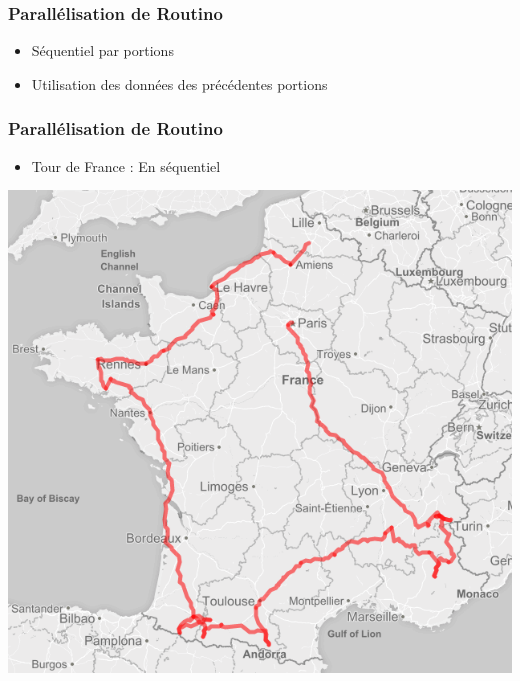 
\begin{frame}
  \frametitle{Parallélisation de Routino}
  \begin{itemize}
  \item Séquentiel par portions
    \vspace{1em}
  \item Utilisation des données des précédentes portions
  \end{itemize}
\end{frame}


\begin{frame}
  \frametitle{Parallélisation de Routino}

  \begin{itemize}
  \item Tour de France : En séquentiel
  \end{itemize}

  \begin{center}
    \includegraphics[scale=0.33]{include/tourfrance_mono.png}
  \end{center}

\end{frame}


